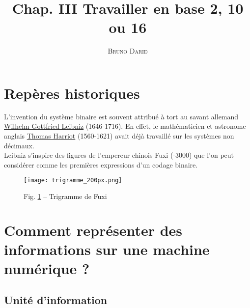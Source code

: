 \documentclass[11pt, french]{article}
\title{Chap. III Travailler en base 2, 10 ou 16}
\author{\textsc{Bruno Darid}}
\makeatletter
\def\maxwidth{\ifdim\Gin@nat@width>\linewidth\linewidth
    \else\Gin@nat@width\fi}
\let\Oldincludegraphics\includegraphics
\renewcommand{\includegraphics}[1]{\Oldincludegraphics[width=.8\maxwidth]{#1}}
\makeatother
\begin{document}
     \renewcommand{\contentsname}{\textsc{Plan}}
    
    \maketitle
    \tableofcontents
    
    \hypertarget{repuxe8res-historiques}{%
\section{Repères historiques}\label{repuxe8res-historiques}}

L'invention du système binaire est souvent attribué à tort au savant
allemand
\href{https://fr.wikipedia.org/wiki/Gottfried_Wilhelm_Leibniz\#Syst\%C3\%A8me_binaire}{Wilhelm
Gottfried Leibniz} (1646-1716). En effet, le mathématicien et astronome
anglais
\href{https://fr.wikipedia.org/wiki/Thomas_Harriot\#Le_math\%C3\%A9maticien}{Thomas
Harriot} (1560-1621) avait déjà travaillé sur les systèmes non
décimaux.\\
Leibniz s'inspire des figures de l'empereur chinois Fuxi (-3000) que
l'on peut considérer comme les premières expressions d'un codage binaire.
\begin{figure}[h]
	\begin{center}
		\texttt{[image: trigramme\_200px.png]} 
	\end{center}
	\caption{Fig. \ref{fig:trigramme} -- Trigramme de Fuxi}
	\label{fig:trigramme}
\end{figure}

    \hypertarget{comment-repruxe9senter-des-informations-sur-une-machine-numuxe9rique}{%
\section{Comment représenter des informations sur une machine numérique
?}\label{comment-repruxe9senter-des-informations-sur-une-machine-numuxe9rique}}

    \hypertarget{Unite-d-information}{%
\subsection{Unité d'information}\label{Unite-d-information}}
\end{document}
